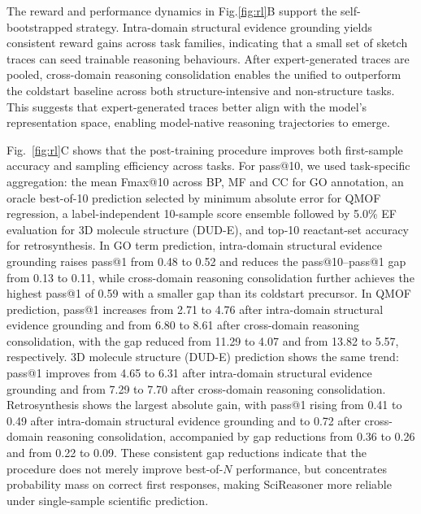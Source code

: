 The reward and performance dynamics in Fig.\ref{fig:rl}B support the self-bootstrapped strategy. Intra-domain structural evidence grounding  yields consistent reward gains across task families, indicating that a small set of sketch traces can seed trainable reasoning behaviours. After expert-generated traces are pooled, cross-domain reasoning consolidation enables the unified \projName{} to outperform the coldstart baseline across both structure-intensive and non-structure tasks. 
This suggests that expert-generated traces better align with the model's representation space, enabling model-native reasoning trajectories to emerge.

Fig.~\ref{fig:rl}C shows that the post-training procedure improves both first-sample accuracy and sampling efficiency across tasks. For pass@10, we used task-specific aggregation: the mean Fmax@10 across BP, MF and CC for GO annotation, an oracle best-of-10 prediction selected by minimum absolute error for QMOF regression, a label-independent 10-sample score ensemble followed by 5.0\% EF evaluation for 3D molecule structure (DUD-E), and top-10 reactant-set accuracy for retrosynthesis. In GO term prediction, intra-domain structural evidence grounding raises pass@1 from 0.48 to 0.52 and reduces the pass@10--pass@1 gap from 0.13 to 0.11, while cross-domain reasoning consolidation further achieves the highest pass@1 of 0.59 with a smaller gap than its coldstart precursor. In QMOF prediction, pass@1 increases from 2.71 to 4.76 after intra-domain structural evidence grounding and from 6.80 to 8.61 after cross-domain reasoning consolidation, with the gap reduced from 11.29 to 4.07 and from 13.82 to 5.57, respectively. 3D molecule structure (DUD-E) prediction shows the same trend: pass@1 improves from 4.65 to 6.31 after intra-domain structural evidence grounding and from 7.29 to 7.70 after cross-domain reasoning consolidation. Retrosynthesis shows the largest absolute gain, with pass@1 rising from 0.41 to 0.49 after intra-domain structural evidence grounding and to 0.72 after cross-domain reasoning consolidation, accompanied by gap reductions from 0.36 to 0.26 and from 0.22 to 0.09. 
These consistent gap reductions indicate that the procedure does not merely improve best-of-$N$ performance, but concentrates probability mass on correct first responses, making SciReasoner more reliable under single-sample scientific prediction.



